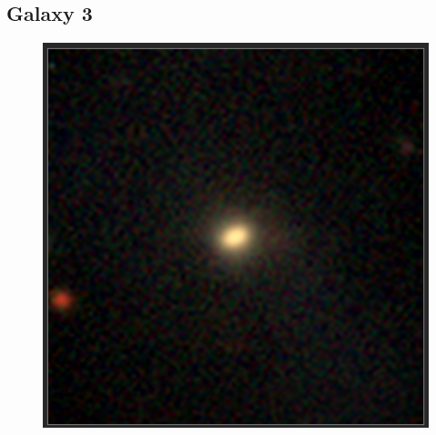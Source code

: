 \documentclass[11pt,letterpaper]{article}
\begin{document}
\subsection*{Galaxy 3}
\begin{figure}[!htbp]
    \centering
    \includegraphics[width=\linewidth]{gal3.png}
\end{figure}

\newpage
\end{document}
